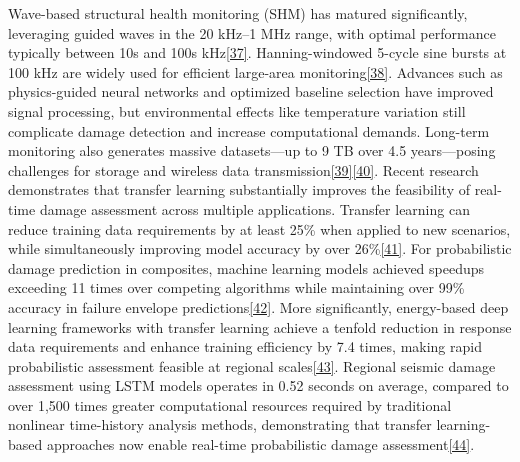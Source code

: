 \documentclass[12pt,a4paper]{report}
\begin{document}
Wave-based structural health monitoring (SHM) has matured significantly, leveraging guided waves in the 20 kHz–1 MHz range, with optimal performance typically between 10s and 100s kHz\href{https://royalsocietypublishing.org/doi/abs/10.1098/rspa.2007.0048}{[37]}. Hanning-windowed 5-cycle sine bursts at 100 kHz are widely used for efficient large-area monitoring\href{https://www.sciencedirect.com/science/article/pii/S0020740322004921}{[38]}.
Advances such as physics-guided neural networks and optimized baseline selection have improved signal processing, but environmental effects like temperature variation still complicate damage detection and increase computational demands. Long-term monitoring also generates massive datasets—up to 9 TB over 4.5 years—posing challenges for storage and wireless data transmission\href{https://pmc.ncbi.nlm.nih.gov/articles/PMC12162875/}{[39]}\href{https://www.researchgate.net/publication/359193759_Temperature_variation_compensated_damage_classification_and_localisation_in_ultrasonic_guided_wave_SHM_using_self-learnt_features_and_Gaussian_mixture_models}{[40]}.
Recent research demonstrates that transfer learning substantially improves the feasibility of real-time damage assessment across multiple applications. Transfer learning can reduce training data requirements by at least 25\% when applied to new scenarios, while simultaneously improving model accuracy by over 26\%\href{https://onlinelibrary.wiley.com/doi/10.1111/mice.12674}{[41]}. For probabilistic damage prediction in composites, machine learning models achieved speedups exceeding 11 times over competing algorithms while maintaining over 99\% accuracy in failure envelope predictions\href{https://4spepublications.onlinelibrary.wiley.com/doi/10.1002/pc.27144}{[42]}. More significantly, energy-based deep learning frameworks with transfer learning achieve a tenfold reduction in response data requirements and enhance training efficiency by 7.4 times, making rapid probabilistic assessment feasible at regional scales\href{https://onlinelibrary.wiley.com/doi/10.1002/eqe.4331}{[43]}. Regional seismic damage assessment using LSTM models operates in 0.52 seconds on average, compared to over 1,500 times greater computational resources required by traditional nonlinear time-history analysis methods, demonstrating that transfer learning-based approaches now enable real-time probabilistic damage assessment\href{https://onlinelibrary.wiley.com/doi/10.1111/mice.12628}{[44]}.  
\end{document}
